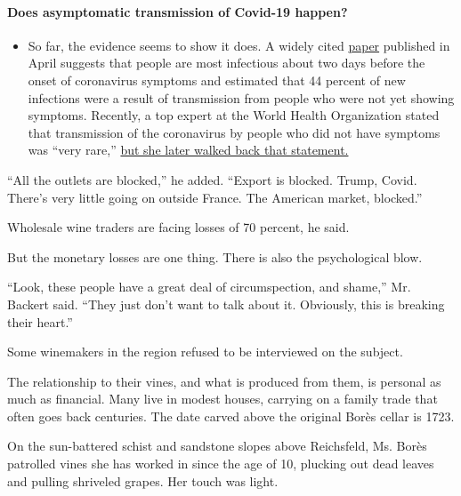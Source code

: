 \begin{itemize}
{  \paragraph{Does asymptomatic transmission of Covid-19
  happen?}\label{does-asymptomatic-transmission-of-covid-19-happen}}

  \begin{itemize}
  \tightlist
  \item
    So far, the evidence seems to show it does. A widely cited
    \href{https://www.nature.com/articles/s41591-020-0869-5}{paper}
    published in April suggests that people are most infectious about
    two days before the onset of coronavirus symptoms and estimated that
    44 percent of new infections were a result of transmission from
    people who were not yet showing symptoms. Recently, a top expert at
    the World Health Organization stated that transmission of the
    coronavirus by people who did not have symptoms was ``very rare,''
    \href{https://www.nytimes3xbfgragh.onion/2020/06/09/world/coronavirus-updates.html?action=click\&pgtype=Article\&state=default\&region=MAIN_CONTENT_3\&context=storylines_faq\#link-1f302e21}{but
    she later walked back that statement.}
  \end{itemize}
\end{itemize}

``All the outlets are blocked,'' he added. ``Export is blocked. Trump,
Covid. There's very little going on outside France. The American market,
blocked.''

Wholesale wine traders are facing losses of 70 percent, he said.

But the monetary losses are one thing. There is also the psychological
blow.

``Look, these people have a great deal of circumspection, and shame,''
Mr. Backert said. ``They just don't want to talk about it. Obviously,
this is breaking their heart.''

Some winemakers in the region refused to be interviewed on the subject.

The relationship to their vines, and what is produced from them, is
personal as much as financial. Many live in modest houses, carrying on a
family trade that often goes back centuries. The date carved above the
original Borès cellar is 1723.

On the sun-battered schist and sandstone slopes above Reichsfeld, Ms.
Borès patrolled vines she has worked in since the age of 10, plucking
out dead leaves and pulling shriveled grapes. Her touch was light.

